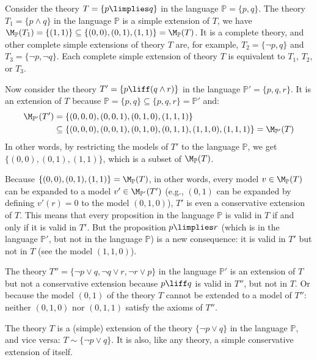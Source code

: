 \begin{example}
Consider the theory $T = \{p \limplies q\}$ in the language $\mathbb P = \{p, q\}$. The theory $T_1 = \{p \land q\}$ in the language $\mathbb P$ is a simple extension of $T$, we have $\M_\mathbb P(T_1) = \{(1, 1)\} \subseteq \{(0, 0), (0, 1), (1, 1)\} = \M_\mathbb P(T)$. It is a complete theory, and other complete simple extensions of theory $T$ are, for example, $T_2 = \{\neg p, q\}$ and $T_3 = \{\neg p, \neg q\}$. Each complete simple extension of theory $T$ is equivalent to $T_1$, $T_2$, or $T_3$.

Now consider the theory $T' = \{p \liff (q \land r)\}$ in the language $\mathbb P' = \{p, q, r\}$. It is an extension of $T$ because $\mathbb P = \{p, q\} \subseteq \{p, q, r\} = \mathbb P'$ and:
\begin{align*}
    \M_{\mathbb P'}(T') &= \{(0, 0, 0), (0, 0, 1), (0, 1, 0), (1, 1, 1)\}\\ 
    &\subseteq \{(0, 0, 0), (0, 0, 1), (0, 1, 0), (0, 1, 1), (1, 1, 0), (1, 1, 1)\} = \M_{\mathbb P'}(T)     
\end{align*}
In other words, by restricting the models of $T'$ to the language $\mathbb P$, we get $\{(0, 0), (0, 1), (1, 1)\}$, which is a subset of $\M_\mathbb P(T)$.

Because $\{(0, 0), (0, 1), (1, 1)\} = \M_\mathbb P(T)$, in other words, every model $v \in \M_\mathbb P(T)$ can be expanded to a model $v' \in \M_{\mathbb P'}(T')$ (e.g., $(0, 1)$ can be expanded by defining $v'(r) = 0$ to the model $(0, 1, 0)$), $T'$ is even a conservative extension of $T$. This means that every proposition in the language $\mathbb P$ is valid in $T$ if and only if it is valid in $T'$. But the proposition $p \limplies r$ (which is in the language $\mathbb P'$, but not in the language $\mathbb P$) is a new consequence: it is valid in $T'$ but not in $T$ (see the model $(1, 1, 0)$).

The theory $T'' = \{\neg p \lor q, \neg q \lor r, \neg r \lor p\}$ in the language $\mathbb P'$ is an extension of $T$ but not a conservative extension because $p \liff q$ is valid in $T''$, but not in $T$. Or because the model $(0, 1)$ of the theory $T$ cannot be extended to a model of $T''$: neither $(0, 1, 0)$ nor $(0, 1, 1)$ satisfy the axioms of $T''$.

The theory $T$ is a (simple) extension of the theory $\{\neg p \lor q\}$ in the language $\mathbb P$, and vice versa: $T \sim \{\neg p \lor q\}$. It is also, like any theory, a simple conservative extension of itself.
\end{example}

